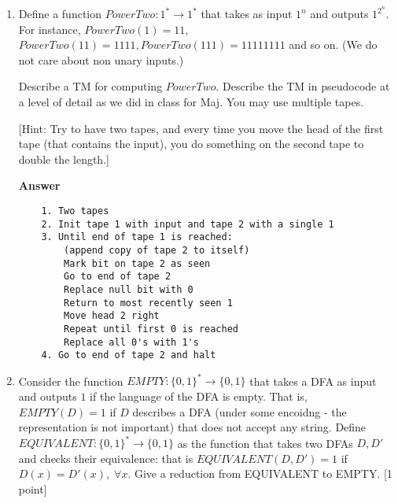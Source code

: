 \documentclass[11pt]{article}
\newcommand \kw[1]{\textbf{#1}}
\newenvironment{answer}{
\vspace{.5cm}
\begin{mdframed}[]
    \kw{Answer} 
}
{
\end{mdframed}
\pagebreak
}
\begin{document}
\begin{enumerate}
\begin{answer}
    
    \begin{verbatim}
        1. Scan left for #
        2. Once found, copy remaining contents onto second tape 
            (i.e. copy x to tape 2)
        3. Move tape 2 head to most significant bit on tape 
        4. Move tape 1 head to least significant bit of i
            (i.e. move until start symbol, then 1 pos right)
        5. (Decbyone) On tape 1, scan left for a 1. For each step:
            If a 1 is found:
                Change 1 to a 0
                Go to end of tape and break loop
            If a 0 is found:
                Change 0 to 1
                Continue
        6. Move tape 2 head to the right
        7. Starting from start of tape 1: 
            Scan right for a 1
            If a one is found, repeat from 5
        8. Clean up tapes and halt
                
    \end{verbatim}
\end{answer}

\item Define a function $PowerTwo:1^* \rightarrow 1^*$ that takes as input $1^n$ and outputs $1^{2^n}$. For instance, $PowerTwo(1) = 11$, $PowerTwo(11) = 1111, PowerTwo(111) = 11111111$ and so on. (We do not care about non unary inputs.)

Describe a TM for computing $PowerTwo$. Describe the TM in pseudocode at a level of detail as we did in class for Maj. You may use multiple tapes. 

[Hint: Try to have two tapes, and every time you move the head of the first tape (that contains the input), you do something on the second tape to double the length.]

\begin{answer}
    
    \begin{verbatim}
    1. Two tapes
    2. Init tape 1 with input and tape 2 with a single 1 
    3. Until end of tape 1 is reached:
        (append copy of tape 2 to itself)
        Mark bit on tape 2 as seen
        Go to end of tape 2
        Replace null bit with 0
        Return to most recently seen 1
        Move head 2 right
        Repeat until first 0 is reached
        Replace all 0's with 1's
    4. Go to end of tape 2 and halt
    \end{verbatim}
\end{answer}

\item Consider the function $EMPTY:\{0,1\}^* \rightarrow \{0,1\}$ that takes a DFA as input and outputs $1$ if the language of the DFA is empty. That is, $EMPTY(D) = 1$ if $D$ describes a DFA (under some encoidng - the representation is not important) that does not accept any string. Define $EQUIVALENT:\{0,1\}^* \rightarrow \{0,1\}$ as the function that takes two DFAs $D,D'$ and checks their equivalence: that is $EQUIVALENT(D,D') = 1$ if $D(x) = D'(x),\; \forall x$. Give a reduction from EQUIVALENT to EMPTY. [1 point]


\end{enumerate}
\end{document}
